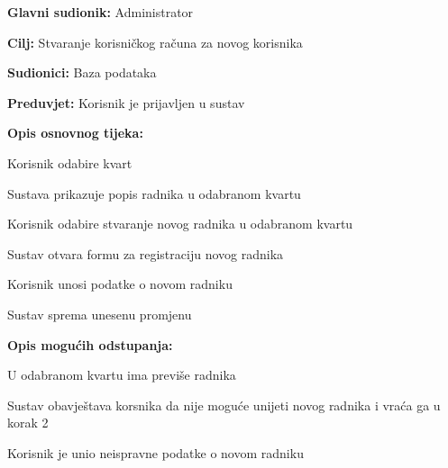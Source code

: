 	\noindent {}
					\begin{packed_item}
	
						\item \textbf{Glavni sudionik: }Administrator
						\item  \textbf{Cilj:} Stvaranje korisničkog računa za novog korisnika
						\item  \textbf{Sudionici:} Baza podataka
						\item  \textbf{Preduvjet:} Korisnik je prijavljen u sustav
						\item  \textbf{Opis osnovnog tijeka:}
						
						\item[] \begin{packed_enum}
	
							\item Korisnik odabire kvart
							\item Sustava prikazuje popis radnika u odabranom kvartu
							\item Korisnik odabire stvaranje novog radnika u odabranom kvartu
							\item Sustav otvara formu za registraciju novog radnika
							\item Korisnik unosi podatke o novom radniku
							\item Sustav sprema unesenu promjenu
						\end{packed_enum}
						
						\item  \textbf{Opis mogućih odstupanja:}
						
						\item[] \begin{packed_item}
	
							\item[3.a] U odabranom kvartu ima previše radnika 
							
							\item[] \begin{packed_enum}
								
								\item Sustav obavještava korsnika da nije moguće unijeti novog radnika i vraća ga u korak 2
								
							\end{packed_enum}
							\item[5. a] Korisnik je unio neispravne podatke o novom radniku 
							
								\item[] \begin{packed_enum}
								

\end{packed_enum}
\end{packed_item}
\end{packed_item}
